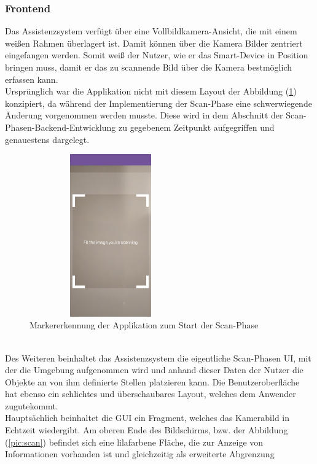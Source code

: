 \subsubsection{Frontend}
Das Assistenzsystem verfügt über eine Vollbildkamera-Ansicht, die mit einem weißen Rahmen überlagert ist. Damit können über die Kamera Bilder zentriert 
eingefangen werden. Somit weiß der Nutzer, wie er das Smart-Device in Position bringen muss, damit er das zu scannende Bild über die Kamera 
bestmöglich erfassen kann. 
\\ 
\linebreak
Ursprünglich war die Applikation nicht mit diesem Layout der Abbildung (\ref{pic:image_tracking}) konzipiert, da während der Implementierung der Scan-Phase eine 
schwerwiegende Änderung vorgenommen werden musste. Diese wird in dem Abschnitt der Scan-Phasen-Backend-Entwicklung zu gegebenem Zeitpunkt 
aufgegriffen und genauestens dargelegt. 
\begin{figure}[hbt!]
    \centering
    \includegraphics[width=7cm,height=7cm,keepaspectratio]{4Umsetzung/Bilder/image_tracking.jpg}
    \caption{Markererkennung der Applikation zum Start der Scan-Phase}
    \label{pic:image_tracking}
\end{figure}
\\
Des Weiteren beinhaltet das Assistenzsystem die eigentliche Scan-Phasen \acs{UI}, mit der die Umgebung aufgenommen wird und anhand dieser Daten 
der Nutzer die Objekte an von ihm definierte Stellen platzieren kann. Die Benutzeroberfläche hat ebenso ein schlichtes und überschaubares Layout, 
welches dem Anwender zugutekommt. 
\\ 
Hauptsächlich beinhaltet die \acs{GUI} ein Fragment, welches das Kamerabild in Echtzeit wiedergibt. Am oberen Ende des Bildschirms, bzw. der Abbildung 
(\ref{pic:scan}) befindet sich eine lilafarbene Fläche, die zur Anzeige von Informationen vorhanden ist und gleichzeitig als erweiterte Abgrenzung 
